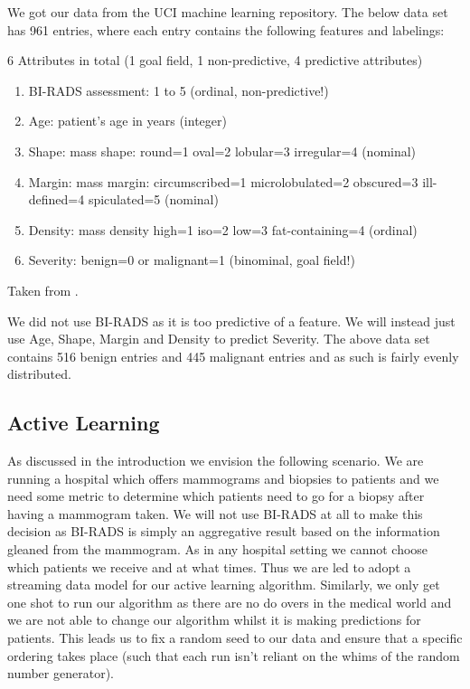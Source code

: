 \documentclass[12pt]{article}
\begin{document}
We got our data from the UCI machine learning repository. The below data set has 961 entries, where each entry contains the following features and labelings: 

6 Attributes in total (1 goal field, 1 non-predictive, 4 predictive attributes) 
\begin{enumerate}
\item BI-RADS assessment: 1 to 5 (ordinal, non-predictive!) 
\item Age: patient's age in years (integer) 
\item Shape: mass shape: round=1 oval=2 lobular=3 irregular=4 (nominal) 
\item Margin: mass margin: circumscribed=1 microlobulated=2 obscured=3 ill-defined=4 spiculated=5 (nominal) 
\item Density: mass density high=1 iso=2 low=3 fat-containing=4 (ordinal) 
\item Severity: benign=0 or malignant=1 (binominal, goal field!) 
\end{enumerate}

Taken from \cite{dataset}.

We did not use BI-RADS as it is too predictive of a feature. We will instead just use Age, Shape, Margin and Density to predict Severity. The above data set contains 516 benign entries and 445 malignant entries and as such is fairly evenly distributed.

\subsection{Active Learning}
As discussed in the introduction we envision the following scenario. We are running a hospital which offers mammograms and biopsies to patients and we need some metric to determine which patients need to go for a biopsy after having a mammogram taken. We will not use BI-RADS at all to make this decision as BI-RADS is simply an aggregative result based on the information gleaned from the mammogram. As in any hospital setting we cannot choose which patients we receive and at what times. Thus we are led to adopt a streaming data model for our active learning algorithm. Similarly, we only get one shot to run our algorithm as there are no do overs in the medical world and we are not able to change our algorithm whilst it is making predictions for patients. This leads us to fix a random seed to our data and ensure that a specific ordering takes place (such that each run isn't reliant on the whims of the random number generator).
\end{document}
